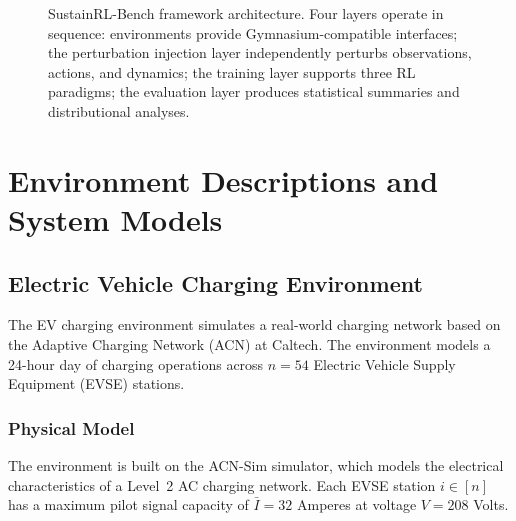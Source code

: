\begin{figure}[htbp]
\caption{SustainRL-Bench framework architecture. Four layers operate in sequence: environments provide Gymnasium-compatible interfaces; the perturbation injection layer independently perturbs observations, actions, and dynamics; the training layer supports three RL paradigms; the evaluation layer produces statistical summaries and distributional analyses.}
\label{fig:framework}
\end{figure}

\section{Environment Descriptions and System Models}
\label{sec:environments}

\subsection{Electric Vehicle Charging Environment}
\label{sec:ev_env}

The EV charging environment simulates a real-world charging network based on the Adaptive Charging Network (ACN) at Caltech. The environment models a 24-hour day of charging operations across $n = 54$ Electric Vehicle Supply Equipment (EVSE) stations.

\subsubsection{Physical Model}

The environment is built on the ACN-Sim simulator, which models the electrical characteristics of a Level~2 AC charging network. Each EVSE station $i \in [n]$ has a maximum pilot signal capacity of $\bar{I} = 32$ Amperes at voltage $V = 208$ Volts.

